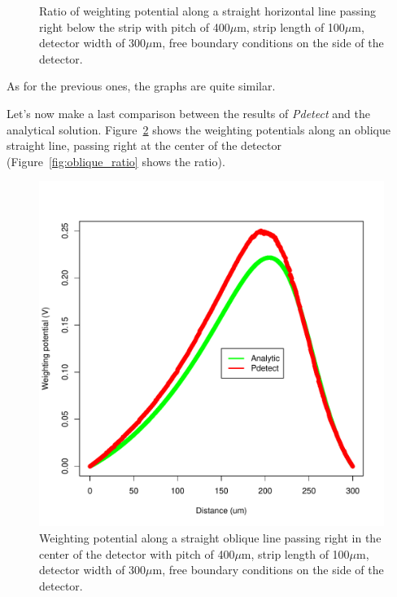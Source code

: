 \documentclass[11pt]{article}
\begin{document}
\begin{figure}[H]
\begin{minipage}[b]{.46\linewidth}
			\caption{Ratio of weighting potential along a straight horizontal line passing right below
					the strip with pitch
					of 400$\mu$m, strip length of 100$\mu$m, detector width of 300$\mu$m, free boundary conditions
					on the side of the detector.}
			\label{fig:horizon_ratio}
		\end{minipage}
	\end{figure}

	As for the previous ones, the graphs are quite similar.

	Let's now make a last comparison between the results of \textit{Pdetect} and the analytical solution.
	Figure~\ref{fig:oblique} shows the weighting potentials along an oblique straight line, passing right at the
	center of the detector (Figure~\ref{fig:oblique_ratio} shows the ratio).

	\begin{figure}[H]
		\begin{minipage}[b]{.46\linewidth}
			\center
			\includegraphics[scale=0.5]{images/annexe/oblique.pdf}
			\caption{Weighting potential along a straight oblique line passing right in the center of
					the detector with pitch
					of 400$\mu$m, strip length of 100$\mu$m, detector width of 300$\mu$m, free boundary conditions
					on the side of the detector.}
			\label{fig:oblique}
		\end{minipage} \hfill

\end{figure}
\end{document}
